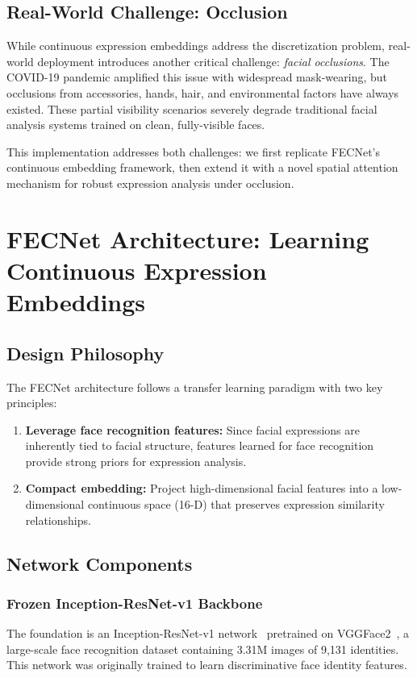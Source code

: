 \documentclass[10pt,twocolumn]{article}
\begin{document}
\subsection{Real-World Challenge: Occlusion}
While continuous expression embeddings address the discretization problem, real-world deployment introduces another critical challenge: \textit{facial occlusions}. The COVID-19 pandemic amplified this issue with widespread mask-wearing, but occlusions from accessories, hands, hair, and environmental factors have always existed. These partial visibility scenarios severely degrade traditional facial analysis systems trained on clean, fully-visible faces.

This implementation addresses both challenges: we first replicate FECNet's continuous embedding framework, then extend it with a novel spatial attention mechanism for robust expression analysis under occlusion.

\section{FECNet Architecture: Learning Continuous Expression Embeddings}

\subsection{Design Philosophy}
The FECNet architecture follows a transfer learning paradigm with two key principles:
\begin{enumerate}
    \item \textbf{Leverage face recognition features:} Since facial expressions are inherently tied to facial structure, features learned for face recognition provide strong priors for expression analysis.
    \item \textbf{Compact embedding:} Project high-dimensional facial features into a low-dimensional continuous space (16-D) that preserves expression similarity relationships.
\end{enumerate}

\subsection{Network Components}

\subsubsection{Frozen Inception-ResNet-v1 Backbone}
The foundation is an Inception-ResNet-v1 network~\cite{szegedy2017inception} pretrained on VGGFace2~\cite{cao2018vggface2}, a large-scale face recognition dataset containing 3.31M images of 9,131 identities. This network was originally trained to learn discriminative face identity features.
\end{document}
